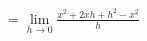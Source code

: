 \documentclass[preview]{standalone}
\begin{document}
\begin{align*}
= \lim_{h \to 0} \frac{x^2 + 2xh + h^2 - x^2}{h}
\end{align*}
\end{document}
